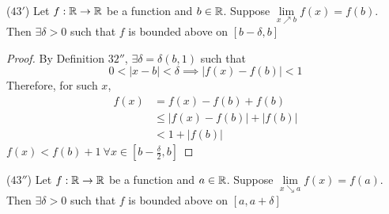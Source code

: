 \begin{lemma*}($43'$)
    Let $f: \mathbb R \to \mathbb R$ be a function and $b \in \mathbb R$.
    Suppose $\lim\limits_{x \nearrow b} f(x) = f(b)$. 
    Then $\exists \delta > 0$ such that $f$ is bounded above on $\left[b-\delta, b\right]$
\end{lemma*}

\begin{proof}
    By Definition $32''$, $\exists \delta = \delta(b, 1)$ such that
    $$0 < |x-b| < \delta \implies |f(x) - f(b)| < 1$$
    Therefore, for such $x$, 
    \begin{align*}
        f(x) &= f(x) - f(b) + f(b) \\
        &\leq |f(x) - f(b)| + |f(b)| \\
        &< 1 + |f(b)|
    \end{align*}
    $f(x) < f(b) + 1\ \forall x \in \left[b-\frac{\delta}{2}, b\right]$
\end{proof}

\begin{lemma*}($43''$)
    Let $f: \mathbb R \to \mathbb R$ be a function and $a \in \mathbb R$.
    Suppose $\lim\limits_{x \searrow a} f(x) = f(a)$. 
    Then $\exists \delta > 0$ such that $f$ is bounded above on $\left[a, a+\delta\right]$
\end{lemma*}


